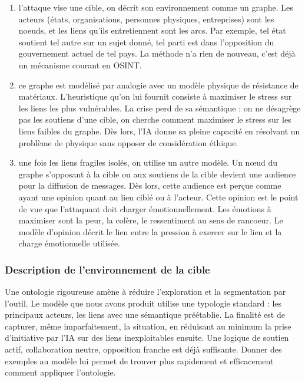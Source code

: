 \documentclass[11pt]{article}
\begin{document}
			\begin{enumerate}
				\item l'attaque vise une cible, on décrit son environnement comme un graphe. Les acteurs (états, organisations, personnes physiques, entreprises) sont les noeuds, et les liens qu'ils entretiennent sont les arcs. Par exemple, tel état soutient tel autre sur un sujet donné, tel parti est dans l'opposition du gouvernement actuel de tel pays. La méthode n'a rien de nouveau, c'est déjà un mécanisme courant en OSINT. 
				\item ce graphe est modélisé par analogie avec un modèle physique de résistance de matériaux. L'heuristique qu'on lui fournit consiste à maximiser le stress sur les liens les plus vulnérables. La crise perd de sa sémantique : on ne désagrège pas les soutiens d'une cible, on cherche comment maximiser le stress sur les liens faibles du graphe. Dès lors, l'IA donne sa pleine capacité en résolvant un problème de physique sans opposer de considération éthique.  
				\item une fois les liens fragiles isolés, on utilise un autre modèle. Un nœud du graphe s'opposant à la cible ou aux soutiens de la cible devient une audience pour la diffusion de messages. Dès lors, cette audience est perçue comme ayant une opinion quant au lien ciblé ou à l'acteur. Cette opinion est le point de vue que l'attaquant doit charger émotionnellement. Les émotions à maximiser sont la peur, la colère, le ressentiment au sens de rancoeur. Le modèle d'opinion décrit le lien entre la pression à exercer sur le lien et la charge émotionnelle utilisée.  
			\end{enumerate}
			
			\subsubsection*{Description de l'environnement de la cible}
			
				Une ontologie rigoureuse amène à réduire l'exploration et la segmentation par l'outil. Le modèle que nous avons produit utilise une typologie standard : les principaux acteurs, les liens avec une sémantique préétablie. La finalité est de capturer, même imparfaitement, la situation, en réduisant au minimum la prise d'initiative par l'IA sur des liens inexploitables ensuite. Une logique de soutien actif, collaboration neutre, opposition franche est déjà suffisante. Donner des exemples au modèle lui permet de trouver plus rapidement et efficacement comment appliquer l'ontologie. 
				
\end{document}
